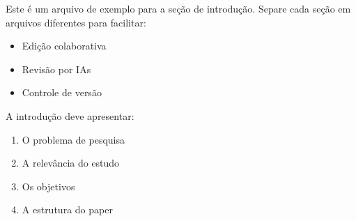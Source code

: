 
Este é um arquivo de exemplo para a seção de introdução.
Separe cada seção em arquivos diferentes para facilitar:
\begin{itemize}
    \item Edição colaborativa
    \item Revisão por IAs
    \item Controle de versão
\end{itemize}

A introdução deve apresentar:
\begin{enumerate}
    \item O problema de pesquisa
    \item A relevância do estudo
    \item Os objetivos
    \item A estrutura do paper
\end{enumerate}
